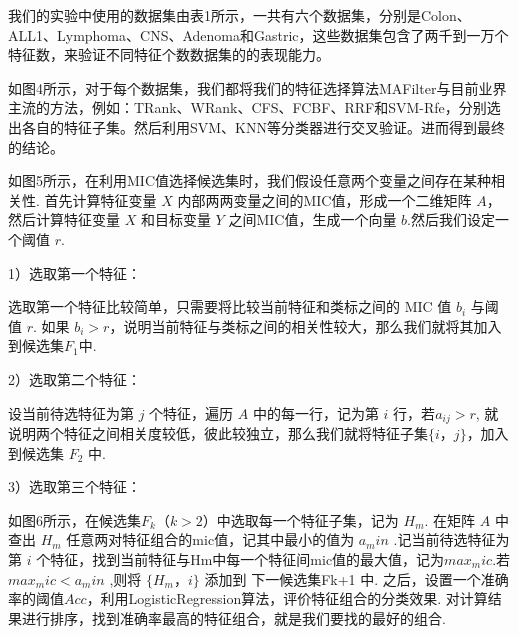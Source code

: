 \documentclass{njubachelor}
\begin{document}
我们的实验中使用的数据集由表1所示，一共有六个数据集，分别是Colon、ALL1、Lymphoma、CNS、Adenoma和Gastric，这些数据集包含了两千到一万个特征数，来验证不同特征个数数据集的的表现能力。


如图4所示，对于每个数据集，我们都将我们的特征选择算法MAFilter与目前业界主流的方法，例如：TRank、WRank、CFS、FCBF、RRF和SVM-Rfe，分别选出各自的特征子集。然后利用SVM、KNN等分类器进行交叉验证。进而得到最终的结论。


如图5所示，在利用MIC值选择候选集时，我们假设任意两个变量之间存在某种相关性. 首先计算特征变量 $X$ 内部两两变量之间的MIC值，形成一个二维矩阵 $A$， 然后计算特征变量 $X$ 和目标变量 $Y$ 之间MIC值，生成一个向量 $b$.然后我们设定一个阈值 $r$.

1）选取第一个特征：

选取第一个特征比较简单，只需要将比较当前特征和类标之间的 MIC 值 $b_i$ 与阈值 $r$. 如果 $b_i > r$，说明当前特征与类标之间的相关性较大，那么我们就将其加入到候选集$F_1$中.

2）选取第二个特征：

设当前待选特征为第 $j$ 个特征，遍历 $A$ 中的每一行，记为第 $i$ 行，若$a_{ij} > r$, 就说明两个特征之间相关度较低，彼此较独立，那么我们就将特征子集$\{i，j\}$，加入到候选集 $F_2$ 中.

3）选取第三个特征：

如图6所示，在候选集$F_k（k>2）$中选取每一个特征子集，记为 $H_m$. 在矩阵 $A$ 中查出 $H_m$ 任意两对特征组合的mic值，记其中最小的值为 $a_min$ .记当前待选特征为第 $i$ 个特征，找到当前特征与Hm中每一个特征间mic值的最大值，记为$max_mic$.若$max_mic < a_min$ ,则将 $\{H_m ，i\}$ 添加到 下一候选集Fk+1 中.
之后，设置一个准确率的阈值$Acc$，利用LogisticRegression算法，评价特征组合的分类效果. 对计算结果进行排序，找到准确率最高的特征组合，就是我们要找的最好的组合.
\end{document}
